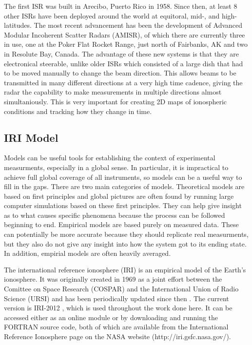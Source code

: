 The first ISR was built in Arecibo, Puerto Rico in 1958.  Since then, at least 8 other ISRs have been deployed around the world at equitoral, mid-, and high-latitudes.  The most recent advancement has been the development of Advanced Modular Incoherent Scatter Radars (AMISR), of which there are currently three in use, one at the Poker Flat Rocket Range, just north of Fairbanks, AK and two in Resolute Bay, Canada.  The advantage of these new systems is that they are electronical steerable, unlike older ISRs which consisted of a large dish that had to be moved manually to change the beam direction.  This allows beams to be transmitted in many different directions at a very high time cadence, giving the radar the capability to make measurements in multiple directions almost simultaniously.  This is very important for creating 2D maps of ionospheric conditions and tracking how they change in time.

\subsection{IRI Model}
Models can be useful tools for establishing the context of experimental measurments, especially in a global sense.  In particular, it is impractical to achieve full global coverage of all instruments, so models can be a useful way to fill in the gaps.  There are two main categories of models.  Theoretical models are based on first principles and global pictures are often found by running large computer simulations based on these first principles.  They can help give insight as to what causes specific phenomena because the process can be followed beginning to end.  Empirical models are based purely on measured data.  These can potentially be more accurate because they should replicate real measurments, but they also do not give any insight into how the system got to its ending state.  In addition, empirial models are often heavily averaged.

The international reference ionosphere (IRI) is an empirical model of the Earth's ionosphere.  It was originally created in 1969 as a joint effort between the Comittee on Space Research (COSPAR) and the International Union of Radio Science (URSI) and has been periodically updated since then \citep{Rawer1978}.  The current version is IRI-2012 \citep{Bilitza2011}, which is used throughout the work done here.  It can be accessed either as an online module or by downloading and running the FORTRAN source code, both of which are available from the International Reference Ionosphere page on the NASA website (http://iri.gsfc.nasa.gov/).

